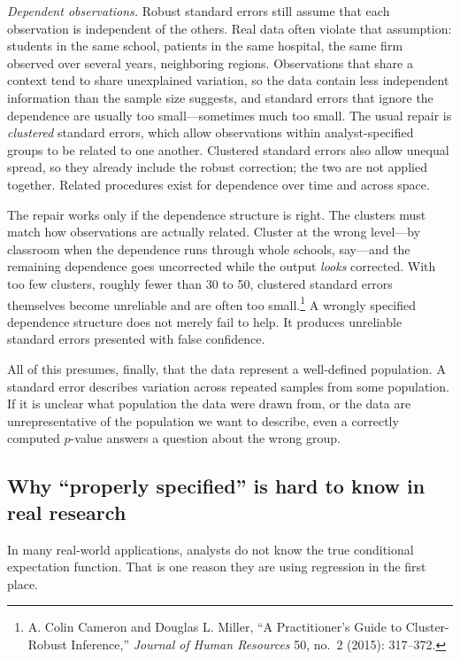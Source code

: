 \documentclass[11pt]{report}
\begin{document}
\emph{Dependent observations.} Robust standard errors still assume that each observation is independent of the others. Real data often violate that assumption: students in the same school, patients in the same hospital, the same firm observed over several years, neighboring regions. Observations that share a context tend to share unexplained variation, so the data contain less independent information than the sample size suggests, and standard errors that ignore the dependence are usually too small---sometimes much too small. The usual repair is \emph{clustered} standard errors, which allow observations within analyst-specified groups to be related to one another. Clustered standard errors also allow unequal spread, so they already include the robust correction; the two are not applied together. Related procedures exist for dependence over time and across space.

The repair works only if the dependence structure is right. The clusters must match how observations are actually related. Cluster at the wrong level---by classroom when the dependence runs through whole schools, say---and the remaining dependence goes uncorrected while the output \emph{looks} corrected. With too few clusters, roughly fewer than 30 to 50, clustered standard errors themselves become unreliable and are often too small.\footnote{A. Colin Cameron and Douglas L. Miller, ``A Practitioner's Guide to Cluster-Robust Inference,'' \emph{Journal of Human Resources} 50, no.~2 (2015): 317--372.} A wrongly specified dependence structure does not merely fail to help. It produces unreliable standard errors presented with false confidence.

All of this presumes, finally, that the data represent a well-defined population. A standard error describes variation across repeated samples from some population. If it is unclear what population the data were drawn from, or the data are unrepresentative of the population we want to describe, even a correctly computed \(p\)-value answers a question about the wrong group.

\subsection{Why ``properly specified'' is hard to know in real research}

In many real-world applications, analysts do not know the true conditional expectation function. That is one reason they are using regression in the first place.
\end{document}
